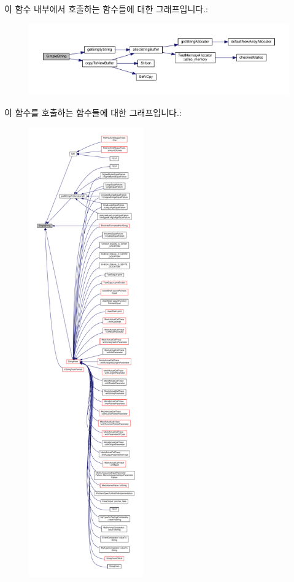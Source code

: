 이 함수 내부에서 호출하는 함수들에 대한 그래프입니다.\+:
\nopagebreak
\begin{figure}[H]
\begin{center}
\leavevmode
\includegraphics[width=350pt]{class_simple_string_a9fa666fba36cf703959cd0e92474b44b_cgraph}
\end{center}
\end{figure}




이 함수를 호출하는 함수들에 대한 그래프입니다.\+:
\nopagebreak
\begin{figure}[H]
\begin{center}
\leavevmode
\includegraphics[height=550pt]{class_simple_string_a9fa666fba36cf703959cd0e92474b44b_icgraph}
\end{center}
\end{figure}


